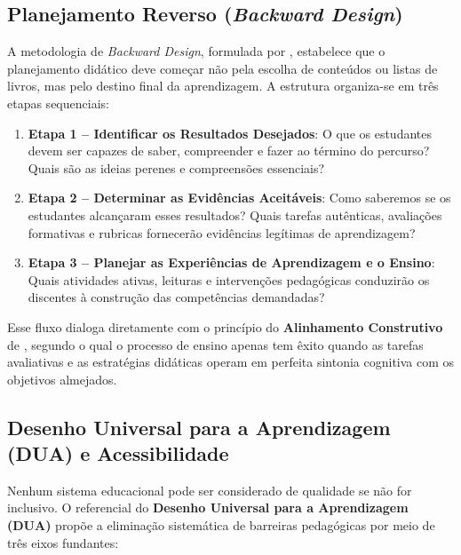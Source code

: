 \subsection{Planejamento Reverso (\emph{Backward Design})}

A metodologia de \emph{Backward Design}, formulada por , estabelece que o planejamento did{\'a}tico deve come{\c c}ar n{\~a}o pela escolha de conte{\'u}dos ou listas de livros, mas pelo destino final da aprendizagem. A estrutura organiza-se em tr{\^e}s etapas sequenciais:

\begin{enumerate}
  \item \textbf{Etapa 1 -- Identificar os Resultados Desejados}: O que os estudantes devem ser capazes de saber, compreender e fazer ao t{\'e}rmino do percurso? Quais s{\~a}o as ideias perenes e compreens{\~o}es essenciais?
  \item \textbf{Etapa 2 -- Determinar as Evid{\^e}ncias Aceit{\'a}veis}: Como saberemos se os estudantes alcan{\c c}aram esses resultados? Quais tarefas aut{\^e}nticas, avalia{\c c}{\~o}es formativas e rubricas fornecer{\~a}o evid{\^e}ncias leg{\'i}timas de aprendizagem?
  \item \textbf{Etapa 3 -- Planejar as Experi{\^e}ncias de Aprendizagem e o Ensino}: Quais atividades ativas, leituras e interven{\c c}{\~o}es pedag{\'o}gicas conduzir{\~a}o os discentes {\`a} constru{\c c}{\~a}o das compet{\^e}ncias demandadas?
\end{enumerate}

Esse fluxo dialoga diretamente com o princ{\'i}pio do \textbf{Alinhamento Construtivo} de , segundo o qual o processo de ensino apenas tem {\^e}xito quando as tarefas avaliativas e as estrat{\'e}gias did{\'a}ticas operam em perfeita sintonia cognitiva com os objetivos almejados.

\subsection{Desenho Universal para a Aprendizagem (DUA) e Acessibilidade}

Nenhum sistema educacional pode ser considerado de qualidade se n{\~a}o for inclusivo. O referencial do \textbf{Desenho Universal para a Aprendizagem (DUA)} \cite{cast2018udl} prop{\~o}e a elimina{\c c}{\~a}o sistem{\'a}tica de barreiras pedag{\'o}gicas por meio de tr{\^e}s eixos fundantes:

